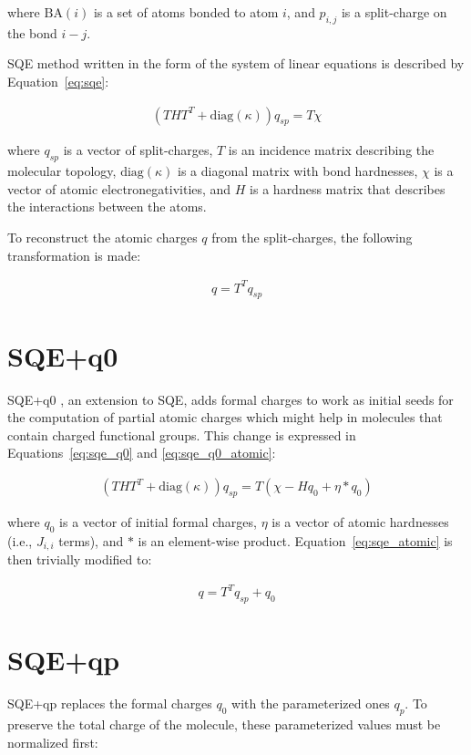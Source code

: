 \documentclass[oneside]{memoir}
\begin{document}
where $\mathrm{BA}(i)$ is a set of atoms bonded to atom $i$, and $p_{i, j}$ is a split-charge on the bond $i - j$.

SQE method written in the form of the system of linear equations is described by Equation~\ref{eq:sqe}:

\begin{gather}
    \label{eq:sqe}
    \left(THT^T + \mathrm{diag}(\kappa)\right)q_{sp} = T\chi
\end{gather}

where $q_{sp}$ is a vector of split-charges, $T$ is an incidence matrix describing the molecular topology, $\mathrm{diag}(\kappa)$ is a diagonal matrix with bond hardnesses, $\chi$ is a vector of atomic electronegativities, and $H$ is a hardness matrix that describes the interactions between the atoms.

To reconstruct the atomic charges $q$ from the split-charges, the following transformation is made:

\begin{gather}
    \label{eq:sqe_atomic}
    q = T^Tq_{sp}
\end{gather}

\section*{SQE+q0}
SQE+q0 \cite{Verstraelen2012}, an extension to SQE, adds formal charges to work as initial seeds for the computation of partial atomic charges which might help in molecules that contain charged functional groups. This change is expressed in Equations~\ref{eq:sqe_q0} and \ref{eq:sqe_q0_atomic}:

\begin{gather}
    \label{eq:sqe_q0}
    \left(THT^T + \mathrm{diag}(\kappa)\right)q_{sp} = T(\chi - Hq_0 + \eta * q_0)
\end{gather}

where $q_0$ is a vector of initial formal charges, $\eta$ is a vector of atomic hardnesses (i.e., $J_{i, i}$ terms), and $*$ is an element-wise product. Equation~\ref{eq:sqe_atomic} is then trivially modified to:

\begin{gather}
    \label{eq:sqe_q0_atomic}
    q = T^Tq_{sp} + q_0
\end{gather}

\section*{SQE+qp}
SQE+qp replaces the formal charges $q_0$ with the parameterized ones $q_p$. To preserve the total charge of the molecule, these parameterized values must be normalized first:
\end{document}
